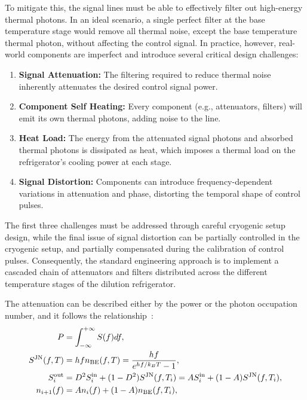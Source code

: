 \documentclass[a4paper,onecolumn,11pt,unpublished]{quantumarticle}
\newcommand{\nBE}{n_{\mathrm{BE}}}
\newcommand{\SJN}{\Stm{JN}{}}
\begin{document}
To mitigate this, the signal lines must be able to effectively filter out high-energy thermal photons. In an ideal scenario, a single perfect filter at the base temperature stage would remove all thermal noise, except the base temperature thermal photon, without affecting the control signal. In practice, however, real-world components are imperfect and introduce several critical design challenges:

\begin{enumerate}
\item \textbf{Signal Attenuation:} The filtering required to reduce thermal noise inherently attenuates the desired control signal power.
\item \textbf{Component Self Heating:} Every component (e.g., attenuators, filters) will emit its own thermal photons, adding noise to the line.
\item \textbf{Heat Load:} The energy from the attenuated signal photons and absorbed thermal photons is dissipated as heat, which imposes a thermal load on the refrigerator's cooling power at each stage.
\item \textbf{Signal Distortion:} Components can introduce frequency-dependent variations in attenuation and phase, distorting the temporal shape of control pulses.
\end{enumerate}

The first three challenges must be addressed through careful cryogenic setup design, while the final issue of signal distortion can be partially controlled in the cryogenic setup, and partially compensated during the calibration of control pulses. Consequently, the standard engineering approach is to implement a cascaded chain of attenuators and filters distributed across the different temperature stages of the dilution refrigerator.

The attenuation can be described either by the power or the photon occupation number, and it follows the relationship~\cite{Clerk2010Introduction,Viennot2014Charge,Gabelli2006Evidence,Nguyen2020Toward,Krinner2019Engineering,Sears2012Photon,Yan2018Distinguishing,Pechal2016Microwave}:
\begin{align}
  P            & = \int_{-\infty}^{+\infty}S(f)df ,\label{eq:def_psd}                                                     \\
  \SJN(f,T)    & = hf \nBE(f,T) = \frac{hf}{e^{hf/k_B T} - 1}, \label{eq:bose_distribution}                               \\
  \Stm{out}{i} & = D^2 \Stm{in}{i} + (1-D^2)\SJN(f,T_i) = A \Stm{in}{i} + (1-A)\SJN(f,T_i), \label{eq:power_input_output} \\
  n_{i+1}(f)   & = A n_i(f) + (1-A) \nBE(f,T_i), \label{eq:photon_occ_chain}
\end{align}
\end{document}

